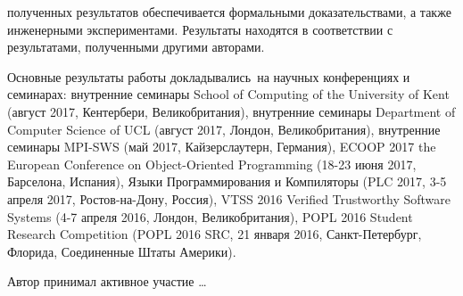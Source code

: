     


    
    

{\reliability} полученных результатов обеспечивается формальными доказательствами,
а также инженерными экспериментами.
Результаты находятся в соответствии с результатами, полученными другими авторами.

{\probation}
Основные результаты работы докладывались~на научных конференциях и семинарах:
внутренние семинары School of Computing of the University of Kent (август 2017, Кентербери, Великобритания),
внутренние семинары Department of Computer Science of UCL (август 2017, Лондон, Великобритания),
внутренние семинары MPI-SWS (май 2017, Кайзерслаутерн, Германия),
ECOOP 2017 the European Conference on Object-Oriented Programming (18-23 июня 2017, Барселона, Испания),
Языки Программирования и Компиляторы (PLC 2017, 3-5 апреля 2017, Ростов-на-Дону, Россия),
VTSS 2016 Verified Trustworthy Software Systems (4-7 апреля 2016, Лондон, Великобритания),
POPL 2016 Student Research Competition (POPL 2016 SRC, 21 января 2016, Санкт-Петербург, Флорида, Соединенные Штаты Америки).

{\contribution} Автор принимал активное участие \ldots


